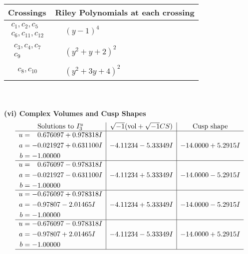 \documentclass[1p]{elsarticle_modified}
\theoremstyle{definition}
\newcommand{\I}{\sqrt{-1}}
\begin{document}
\begin{tabular}{m{50pt}|m{274pt}}
Crossings & \hspace{64pt}Riley Polynomials at each crossing \\
\hline $$\begin{aligned}c_{1},c_{2},c_{5}\\c_{6},c_{11},c_{12}\end{aligned}$$&$\begin{aligned}
&(y-1)^4
\end{aligned}$\\
\hline $$\begin{aligned}c_{3},c_{4},c_{7}\\c_{9}\end{aligned}$$&$\begin{aligned}
&(y^2+y+2)^2
\end{aligned}$\\
\hline $$\begin{aligned}c_{8},c_{10}\end{aligned}$$&$\begin{aligned}
&(y^2+3 y+4)^2
\end{aligned}$\\
\hline
\end{tabular}\\~\\
\newpage\flushleft \textbf{(vi) Complex Volumes and Cusp Shapes}
$$\begin{array}{c|c|c}  
\text{Solutions to }I^u_{3}& \I (\text{vol} + \sqrt{-1}CS) & \text{Cusp shape}\\
 \hline 
\begin{aligned}
u &= \phantom{-}0.676097 + 0.978318 I \\
a &= -0.021927 + 0.631100 I \\
b &= -1.00000\phantom{ +0.000000I}\end{aligned}
 & -4.11234 - 5.33349 I & -14.0000 + 5.2915 I \\ \hline\begin{aligned}
u &= \phantom{-}0.676097 - 0.978318 I \\
a &= -0.021927 - 0.631100 I \\
b &= -1.00000\phantom{ +0.000000I}\end{aligned}
 & -4.11234 + 5.33349 I & -14.0000 - 5.2915 I \\ \hline\begin{aligned}
u &= -0.676097 + 0.978318 I \\
a &= -0.97807 - 2.01465 I \\
b &= -1.00000\phantom{ +0.000000I}\end{aligned}
 & -4.11234 + 5.33349 I & -14.0000 - 5.2915 I \\ \hline\begin{aligned}
u &= -0.676097 - 0.978318 I \\
a &= -0.97807 + 2.01465 I \\
b &= -1.00000\phantom{ +0.000000I}\end{aligned}
 & -4.11234 - 5.33349 I & -14.0000 + 5.2915 I\\
 \hline 
 \end{array}$$\newpage\newpage\renewcommand{\arraystretch}{1}
\end{document}
